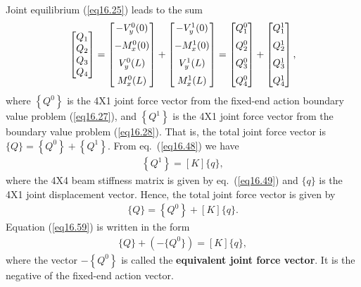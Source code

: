 \documentclass{AeroStructure-ERJohnson}
\begin{document}
Joint equilibrium (\ref{eq16.25}) leads to the sum
\begin{align}\label{eq16.57}
\left[\begin{array}{@{}l@{}}Q_{1} \\Q_{2} \\Q_{3} \\Q_{4}\end{array}\right]=\left[\begin{array}{@{}c@{}}-V_{y}^{0}(0) \\[6pt]-M_{x}^{0}(0) \\[6pt]V_{y}^{0}(L) \\[6pt]M_{x}^{0}(L)\end{array}\right]+\left[\begin{array}{@{}c@{}}-V_{y}^{1}(0) \\[6pt]-M_{x}^{1}(0) \\[6pt]V_{y}^{1}(L) \\[6pt]M_{x}^{1}(L)\end{array}\right]=\left[\begin{array}{@{}l@{}}Q_{1}^{0} \\[6pt]Q_{2}^{0} \\[6pt]Q_{3}^{0} \\[6pt]Q_{4}^{0}\end{array}\right]+\left[\begin{array}{@{}l@{}}Q_{1}^{1} \\[6pt]Q_{2}^{1} \\[6pt]Q_{3}^{1} \\[6pt]Q_{4}^{1}\end{array}\right],
\end{align}
where $\left\{Q^{0}\right\}$ is the 4X1 joint force vector from the fixed-end action boundary value problem (\ref{eq16.27}), and $\left\{Q^{1}\right\}$ is the 4X1 joint force vector from the boundary value problem (\ref{eq16.28}). That is, the total joint force vector is $\{Q\}=\left\{Q^{0}\right\}+\left\{Q^{1}\right\}$. From eq.~(\ref{eq16.48}) we have
\begin{align}\label{eq16.58}
\left\{Q^{1}\right\}=[K]\{q\},
\end{align}
where the 4X4 beam stiffness matrix is given by eq.~(\ref{eq16.49}) and $\{q\}$ is the 4X1 joint displacement vector. Hence, the total joint force vector is given by
\begin{align}\label{eq16.59}
\{Q\}=\left\{Q^{0}\right\}+[K]\{q\}.
\end{align}
Equation (\ref{eq16.59}) is written in the form
\begin{align}\label{eq16.60}
\{Q\}+(-\{Q^{0}\})=[K]\{q\},
\end{align}
where the vector $-\left\{Q^{0}\right\}$ is called the \textbf{equivalent joint force vector}. It is the negative of the fixed-end action vector.
\end{document}
